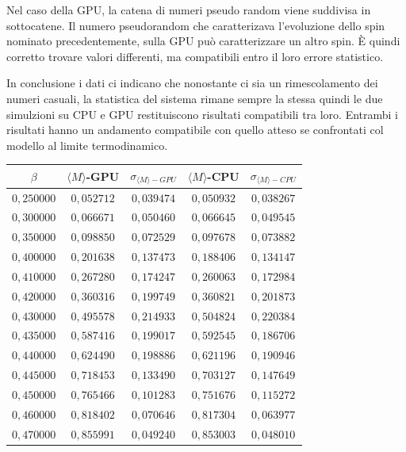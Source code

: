 \documentclass[a4paper,12pt]{article}
\begin{document}
Nel caso della GPU, la catena di numeri pseudo random viene suddivisa in sottocatene. Il numero pseudorandom che caratterizava l'evoluzione dello spin nominato precedentemente, sulla GPU può caratterizzare un altro spin. \`E  quindi corretto trovare valori differenti, ma compatibili entro il loro errore statistico. 

In conclusione i dati ci indicano che nonostante ci sia un rimescolamento dei numeri casuali, la statistica del sistema rimane sempre la stessa quindi le due simulzioni su CPU e GPU restituiscono risultati compatibili tra loro. Entrambi i risultati hanno un andamento compatibile con quello atteso se confrontati col modello al limite termodinamico.   

\begin{table}
\begin{center}
\begin {tabular}{c|c|c|c|c}
\hline
\hline
$\beta$ & $\langle  M \rangle$-GPU & $\sigma_{\langle  M \rangle-GPU}$ & $\langle  M \rangle$-CPU & $\sigma_{\langle  M \rangle-CPU}$        \\
\hline
$0,250000$ &    $0,052712$   &     $0,039474$ &  $0,050932$  &  $0,038267$\\
$0,300000$ &     $0,066671$     &   $0,050460$ &  $0,066645$  &  $0,049545$\\
$0,350000$ &      $0,098850$    &    $0,072529$ &  $0,097678$  &  $0,073882$\\
$0,400000$ &      $0,201638$   &     $0,137473$  &  $0,188406$  &  $0,134147$\\
$0,410000$ &       $0,267280$   &     $0,174247$  &  $0,260063$  &  $0,172984$\\
$0,420000$ &       $0,360316$   &     $0,199749$  &  $0,360821$  &  $0,201873$\\
$0,430000$ &       $0,495578$   &     $0,214933$  &  $0,504824$  &  $0,220384$\\
$0,435000$ &       $0,587416$   &     $0,199017$  &  $0,592545$  &  $0,186706$\\
$0,440000$ &       $0,624490$   &     $0,198886$  &  $0,621196$  &  $0,190946$\\
$0,445000$ &       $0,718453$   &     $0,133490$  &  $0,703127$  &  $0,147649$\\
$0,450000$ &       $0,765466$   &     $0,101283$  &  $0,751676$  &  $0,115272$\\
$0,460000$ &       $0,818402$   &     $0,070646$  &  $0,817304$  &  $0,063977$\\
$0,470000$ &       $0,855991$   &     $0,049240$  &  $0,853003$  &  $0,048010$\\

\end{tabular}
\end{center}
\end{table}
\end{document}
